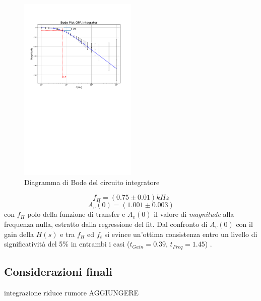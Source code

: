 \documentclass[journal]{IEEEtran}
\begin{document}
\begin{figure}[H]%
\begin {center}
\includegraphics[width=0.50\textwidth]{analysis/output/OPA-integrator_bode(mag).pdf}
\caption{Diagramma di Bode del circuito integratore}
\label{fig:integ-bode}
\end {center}
\end{figure}
\[f_H = (0.75 \pm 0.01) kHz\]
\[A_v(0) = (1.001 \pm 0.003)\]
con $f_H$ polo della funzione di transfer e $A_v(0)$ il valore di \textit{magnitude} alla frequenza nulla, estratto dalla regressione del fit.
Dal confronto di $A_v(0)$ con il gain della $H(s)$ e tra $f_H$ ed $f_t$ si evince un'ottima consistenza entro un livello di significatività del 5\% in entrambi i casi ($t_{Gain} = 0.39 $, $t_{Freq} = 1.45 $) .
\subsection{\textbf{Considerazioni finali}}

integrazione riduce rumore AGGIUNGERE
\end{document}
